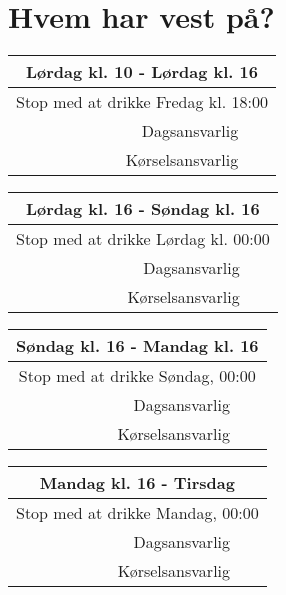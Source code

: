 \documentclass[../../main.tex]{subfiles}
\begin{document}
\section{Hvem har vest på?}
\begin{center}
\begin{tabularx}{0.5\textwidth}{|r|X|}
\hline \multicolumn{2}{|c|}{\textbf{Lørdag kl. 10 - Lørdag kl. 16}} \\
\hline \multicolumn{2}{|c|}{Stop med at drikke Fredag kl. 18:00} \\
\hline\hline Dagsansvarlig &  \\
\hline Kørselsansvarlig &  \\
\hline
\end{tabularx}

\begin{tabularx}{0.5\textwidth}{|r|X|}
\hline \multicolumn{2}{|c|}{\textbf{Lørdag kl. 16 - Søndag kl. 16}} \\
\hline \multicolumn{2}{|c|}{Stop med at drikke Lørdag kl. 00:00} \\
\hline\hline Dagsansvarlig &  \\
\hline Kørselsansvarlig &  \\
\hline
\end{tabularx}

\begin{tabularx}{0.5\textwidth}{|r|X|}
\hline \multicolumn{2}{|c|}{\textbf{Søndag kl. 16 - Mandag kl. 16}} \\
\hline \multicolumn{2}{|c|}{Stop med at drikke Søndag, 00:00} \\
\hline\hline Dagsansvarlig &  \\
\hline Kørselsansvarlig &  \\
\hline
\end{tabularx}

\begin{tabularx}{0.5\textwidth}{|r|X|}
\hline \multicolumn{2}{|c|}{\textbf{Mandag kl. 16 - Tirsdag}} \\
\hline \multicolumn{2}{|c|}{Stop med at drikke Mandag, 00:00} \\
\hline\hline Dagsansvarlig &  \\
\hline Kørselsansvarlig &  \\
\hline
\end{tabularx}
\end{center}
\end{document}
